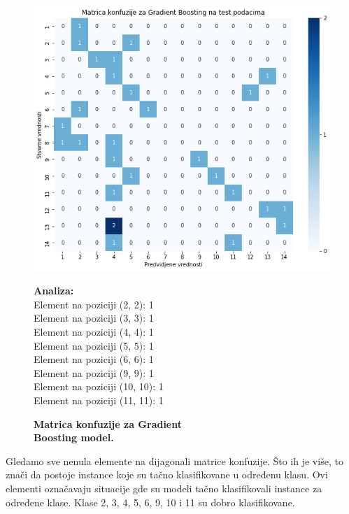 \documentclass{article}
\begin{document}
\newpage


\begin{figure}[ht]
    \begin{minipage}{0.5\textwidth}
        \centering
        \includegraphics[width=\linewidth]{gradientconf.png}
        \captionsetup{justification=centering}
        \caption*{\textbf{Matrica konfuzije za Gradient \\Boosting model.}}
        \label{fig:nedostajuce}
    \end{minipage}%
    \begin{minipage}{0.5\textwidth}
        \textbf{Analiza:}\\
        
        \vspace{1mm}
        Element na poziciji (2, 2): 1\\
        Element na poziciji (3, 3): 1\\
        Element na poziciji (4, 4): 1\\
        Element na poziciji (5, 5): 1\\
        Element na poziciji (6, 6): 1\\
        Element na poziciji (9, 9): 1\\
        Element na poziciji (10, 10): 1\\
        Element na poziciji (11, 11): 1\\
    \end{minipage}
\end{figure}
\begin{flushleft}

Gledamo sve nenula elemente na dijagonali matrice konfuzije. Što ih je više, to znači da postoje instance koje su tačno klasifikovane u određenu klasu. Ovi elementi označavaju situacije gde su modeli tačno klasifikovali instance za određene klase. Klase 2, 3, 4, 5, 6, 9, 10 i 11 su dobro klasifikovane. 

\end{flushleft}
\end{document}
